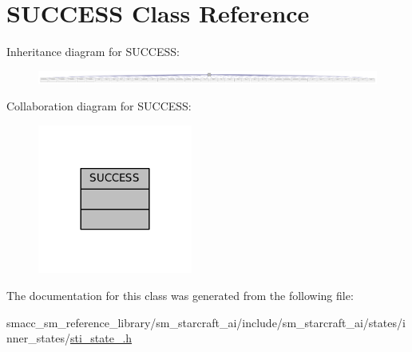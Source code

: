 \hypertarget{classSUCCESS}{}\section{S\+U\+C\+C\+E\+SS Class Reference}
\label{classSUCCESS}


Inheritance diagram for S\+U\+C\+C\+E\+SS\+:
\nopagebreak
\begin{figure}[H]
\begin{center}
\leavevmode
\includegraphics[width=350pt]{classSUCCESS__inherit__graph}
\end{center}
\end{figure}


Collaboration diagram for S\+U\+C\+C\+E\+SS\+:
\nopagebreak
\begin{figure}[H]
\begin{center}
\leavevmode
\includegraphics[width=144pt]{classSUCCESS__coll__graph}
\end{center}
\end{figure}


The documentation for this class was generated from the following file\+:\begin{DoxyCompactItemize}
\item 
smacc\+\_\+sm\+\_\+reference\+\_\+library/sm\+\_\+starcraft\+\_\+ai/include/sm\+\_\+starcraft\+\_\+ai/states/inner\+\_\+states/\hyperlink{sm__starcraft__ai_2include_2sm__starcraft__ai_2states_2inner__states_2sti__state__3_8h}{sti\+\_\+state\+\_.\+h}\end{DoxyCompactItemize}
